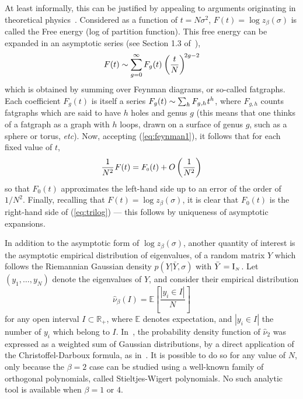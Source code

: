 \documentclass[draftclsnofoot]{IEEEtran}
\begin{document}
At least informally, this can be justified by appealing to arguments
originating in theoretical physics~\cite{Ma05}. Considered as a function of $t = N\sigma^2$, $F(t) = \log z_\beta(\sigma)$ is called the Free energy (log of partition function). This free energy can be expanded in an asymptotic series (see Section 1.3 of~\cite{Ma05}),
\begin{equation} \label{eq:feynman1}
  F(t) \sim \sum^\infty_{g=0} F_g(t)\hspace{0.02cm}\left(\frac{t}{N}\right)^{\!2g-2}
\end{equation}
which is obtained by summing over Feynman diagrams, or so-called fatgraphs. Each coefficient $F_g(t)$ is itself a series $F_g(t) \sim \sum_h  F_{g,h}\hspace{0.02cm}t^h$, where $F_{g,h}$ counts fatgraphs which are said to have $h$ holes and genus $g$ (this means that one thinks of a fatgraph as a graph with $h$ loops, drawn on a surface of genus $g$, such as a sphere or torus, \textit{etc}). Now, accepting (\ref{eq:feynman1}), it follows that for each fixed value of $t$,
\begin{equation} \label{eq:feynman2}
  \frac{1}{N^2}\hspace{0.02cm}F(t) = F_{\scriptscriptstyle 0}(t) + O\left(\frac{1}{N^2}\right)
\end{equation}
so that $F_{\scriptscriptstyle 0}(t)$ approximates the left-hand side up to an error of the order of $1/N^2$. Finally, recalling that $F(t) = \log z_\beta(\sigma)$, it is clear that $F_{\scriptscriptstyle 0}(t)$ is the right-hand side of (\ref{eq:trilog}) --- this follows by uniqueness of asymptotic expansions. 

In addition to the asymptotic form of $\log z_\beta(\sigma)$, another quantity of interest is the asymptotic empirical distribution of eigenvalues, of a random matrix $Y$ which follows the Riemannian Gaussian density $p(Y|\bar{Y},\sigma)$ with $\bar{Y} = \mathrm{I}_{\scriptscriptstyle N}\hspace{0.03cm}$. Let $(y_{\scriptscriptstyle 1},\ldots,y_{\scriptscriptstyle N})$ denote the eigenvalues of $Y$, and consider their empirical distribution
\begin{equation} \label{eq:R1}
  \hat{\nu}_\beta(I) = \mathbb{E}\left[\frac{\left| y_i \in I\right|}{N} \right]
\end{equation}
for any open interval $I \subset \mathbb{R}_+$, where $\mathbb{E}$ denotes expectation, and $| y_i \in I|$ the number of $y_i$ which belong to $I$. In~\cite{Ti20}, the probability density function of $\hat{\nu}_{\scriptscriptstyle 2}$ was expressed as a weighted sum of Gaussian distributions, by a direct application of the Christoffel-Darboux formula, as in~\cite{deift}. It is possible to do so for any value of $N$, only because the $\beta = 2$ case can be studied using a well-known family of orthogonal polynomials, called Stieltjes-Wigert polynomials. No such analytic tool is available when $\beta = 1$ or $4$.
\end{document}
